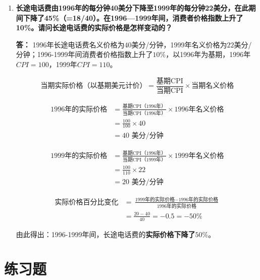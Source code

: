 \begin{enumerate}[label=\textbf{\arabic*.}, leftmargin=*]
		\textbf{答：}
		日元相对美元升值，意味着美元兑换日元的数量变少，美元购买力下降。美国消费者需要花费更多美元才能兑换同等日元，用以购买日本汽车，因此日本商品以美元计价的实际价格会上升。
		
		反之，日元购买力增强，相同数量的日元可以兑换更多美元。日本消费者购买美国汽车时所需支出的日元变少，最终使得美国汽车在日本的实际价格有所下降。
		
		\item \textbf{长途电话费由1996年的每分钟40美分下降至1999年的每分钟22美分，在此期间下降了45\%（=18/40）。在1996—1999年间，消费者价格指数上升了10\%。请问长途电话费的实际价格是怎样变动的？}
		
		\textbf{答：}
		1996年长途电话费名义价格为$40$美分/分钟，1999年名义价格为$22$美分/分钟；1996-1999年间消费者价格指数上升了$10\%$，以1996年为基期，1996年$CPI=100$，1999年$CPI=110$。
		
		$$ \text{当期实际价格（以基期美元计价）} = \frac{\text{基期CPI}}{\text{当期CPI}} \times \text{当期名义价格} $$
		
		$$ \begin{aligned}
			\text{1996年的实际价格} &= \frac{\text{基期CPI（1996年）}}{\text{当期CPI（1996年）}} \times \text{1996年名义价格} \\
			&= \frac{100}{100} \times 40 \\
			&= 40 \text{ 美分/分钟}
		\end{aligned} $$
		
		$$ \begin{aligned}
			\text{1999年的实际价格} &= \frac{\text{基期CPI（1996年）}}{\text{当期CPI（1999年）}} \times \text{1999年名义价格} \\
			&= \frac{100}{110} \times 22 \\
			&= 20 \text{ 美分/分钟}
		\end{aligned} $$
		
		$$ \begin{aligned}
			\text{实际价格百分比变化} &= \frac{\text{1999年的实际价格} - \text{1996年的实际价格}}{\text{1996年的实际价格}} \\
			&= \frac{20 - 40}{40} = -0.5 = -50\%
		\end{aligned} $$
		
		由此得出：1996-1999年间，长途电话费的\textbf{实际价格下降了$50\%$}。

	\end{enumerate}
	
	\section{练习题}
	
